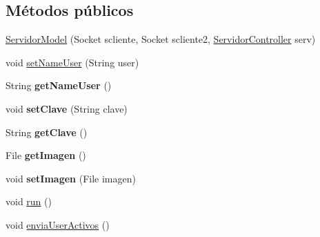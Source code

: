 \subsection*{Métodos públicos}
\begin{DoxyCompactItemize}
\item 
\hyperlink{classcom_1_1ucab_1_1javachat_1_1_servidor_1_1model_1_1_servidor_model_aa0ce2b6483d9538d362f45e2ff7e7263}{Servidor\-Model} (Socket scliente, Socket scliente2, \hyperlink{classcom_1_1ucab_1_1javachat_1_1_servidor_1_1controller_1_1_servidor_controller}{Servidor\-Controller} serv)
\item 
void \hyperlink{classcom_1_1ucab_1_1javachat_1_1_servidor_1_1model_1_1_servidor_model_a21f82e0d41c53cb292a639e580e5eb59}{set\-Name\-User} (String user)
\item 
\hypertarget{classcom_1_1ucab_1_1javachat_1_1_servidor_1_1model_1_1_servidor_model_aad88766777b8f162d8ee92ba5de47fee}{String {\bfseries get\-Name\-User} ()}\label{classcom_1_1ucab_1_1javachat_1_1_servidor_1_1model_1_1_servidor_model_aad88766777b8f162d8ee92ba5de47fee}

\item 
\hypertarget{classcom_1_1ucab_1_1javachat_1_1_servidor_1_1model_1_1_servidor_model_a72058125b761c7703bad54a8bec5c25a}{void {\bfseries set\-Clave} (String clave)}\label{classcom_1_1ucab_1_1javachat_1_1_servidor_1_1model_1_1_servidor_model_a72058125b761c7703bad54a8bec5c25a}

\item 
\hypertarget{classcom_1_1ucab_1_1javachat_1_1_servidor_1_1model_1_1_servidor_model_a41c2949a837481f36ee9cb7b3c77dd80}{String {\bfseries get\-Clave} ()}\label{classcom_1_1ucab_1_1javachat_1_1_servidor_1_1model_1_1_servidor_model_a41c2949a837481f36ee9cb7b3c77dd80}

\item 
\hypertarget{classcom_1_1ucab_1_1javachat_1_1_servidor_1_1model_1_1_servidor_model_aa0cf65003f403b8a0c6f1e9032c853b9}{File {\bfseries get\-Imagen} ()}\label{classcom_1_1ucab_1_1javachat_1_1_servidor_1_1model_1_1_servidor_model_aa0cf65003f403b8a0c6f1e9032c853b9}

\item 
\hypertarget{classcom_1_1ucab_1_1javachat_1_1_servidor_1_1model_1_1_servidor_model_a12e272b5a7e681f61b9f10e40a88d2f7}{void {\bfseries set\-Imagen} (File imagen)}\label{classcom_1_1ucab_1_1javachat_1_1_servidor_1_1model_1_1_servidor_model_a12e272b5a7e681f61b9f10e40a88d2f7}

\item 
void \hyperlink{classcom_1_1ucab_1_1javachat_1_1_servidor_1_1model_1_1_servidor_model_af0b98666d6d12da06af6b540e0c873ba}{run} ()
\item 
void \hyperlink{classcom_1_1ucab_1_1javachat_1_1_servidor_1_1model_1_1_servidor_model_abfffc25f39d081dff7523f899a3786f5}{envia\-User\-Activos} ()
\end{DoxyCompactItemize}
